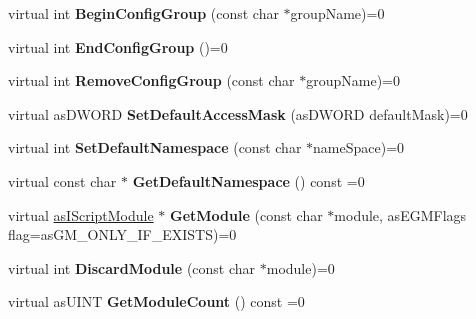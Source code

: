 \begin{DoxyCompactItemize}
\mbox{\label{classas_i_script_engine_ac81014e50dd7efc1920adcb3fd2d1e5d}} 
virtual int {\bfseries Begin\+Config\+Group} (const char $\ast$group\+Name)=0
\item 
\mbox{\label{classas_i_script_engine_a4cc5ed7ea71811655f7910d298bb5a02}} 
virtual int {\bfseries End\+Config\+Group} ()=0
\item 
\mbox{\label{classas_i_script_engine_ab607be7fe727cdcce502d2beedbf4c0a}} 
virtual int {\bfseries Remove\+Config\+Group} (const char $\ast$group\+Name)=0
\item 
\mbox{\label{classas_i_script_engine_a570df3e676f2d9e03e87d97b8cede1c7}} 
virtual as\+D\+W\+O\+RD {\bfseries Set\+Default\+Access\+Mask} (as\+D\+W\+O\+RD default\+Mask)=0
\item 
\mbox{\label{classas_i_script_engine_a605f114814f1f64804c04391816d948b}} 
virtual int {\bfseries Set\+Default\+Namespace} (const char $\ast$name\+Space)=0
\item 
\mbox{\label{classas_i_script_engine_a257a25e285faa25e8cf08e455528def7}} 
virtual const char $\ast$ {\bfseries Get\+Default\+Namespace} () const =0
\item 
\mbox{\label{classas_i_script_engine_a9f7cdc52b59034e6e55eb8a56b427aa4}} 
virtual \hyperlink{classas_i_script_module}{as\+I\+Script\+Module} $\ast$ {\bfseries Get\+Module} (const char $\ast$module, as\+E\+G\+M\+Flags flag=as\+G\+M\+\_\+\+O\+N\+L\+Y\+\_\+\+I\+F\+\_\+\+E\+X\+I\+S\+TS)=0
\item 
\mbox{\label{classas_i_script_engine_afb0ce55e5846eb18afdcf906aeb67cf7}} 
virtual int {\bfseries Discard\+Module} (const char $\ast$module)=0
\item 
\mbox{\label{classas_i_script_engine_a457cf6202cc64ce8ee242dcc97d3422f}} 
virtual as\+U\+I\+NT {\bfseries Get\+Module\+Count} () const =0
\item 
\mbox{\label{classas_i_script_engine_a31b95df21e6f1990cf84b3b286067675}} 

\end{DoxyCompactItemize}

